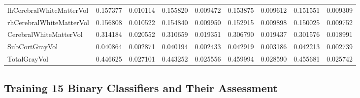 \documentclass[diagnostics,article,accept,pdftex,moreauthors]{Definitions/mdpi}
\begin{document}
\begin{table}[H]
\begin{tabular}{lcccccccc}
lhCerebralWhiteMatterVol & 0.157377 & 0.010114 & 0.155820 & 0.009472 & 0.153875 & 0.009612 & 0.151551 & 0.009309 \\
rhCerebralWhiteMatterVol & 0.156808 & 0.010522 & 0.154840 & 0.009950 & 0.152915 & 0.009898 & 0.150025 & 0.009752 \\
CerebralWhiteMatterVol & 0.314184 & 0.020552 & 0.310659 & 0.019351 & 0.306790 & 0.019437 & 0.301576 & 0.018991 \\
SubCortGrayVol & 0.040864 & 0.002871 & 0.040194 & 0.002433 & 0.042919 & 0.003186 & 0.042213 & 0.002739 \\
TotalGrayVol & 0.446625 & 0.027101 & 0.443252 & 0.025556 & 0.459994 & 0.028590 & 0.455681 & 0.025742 \\
\toprule
\end{tabular}

\label{tab:version_fs7cross_fs7long_comparison}
\end{table}




\subsection{Training 15 Binary Classifiers and Their Assessment}

\vspace{-6pt}
\end{document}
